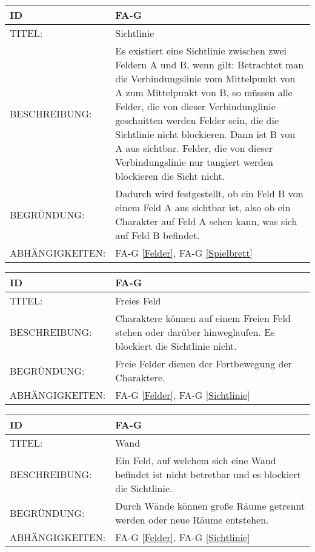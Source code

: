 \begin{tabularx}{16cm}{l|X}
	{table}\label{Sichtlinie}
	\textbf{ID} & \textbf{FA-G \arabic{table}} \\
	\hline
	TITEL: & Sichtlinie \\
	\hline
	BESCHREIBUNG: & Es existiert eine Sichtlinie zwischen zwei Feldern A und B, wenn gilt: Betrachtet man die Verbindungslinie vom Mittelpunkt von A zum Mittelpunkt von B, so müssen alle Felder, die von dieser Verbindunglinie geschnitten werden Felder sein, die die Sichtlinie nicht blockieren. Dann ist B von A aus sichtbar. Felder, die von dieser Verbindungslinie nur tangiert werden blockieren die Sicht nicht. \\
	\hline
	BEGRÜNDUNG: & Dadurch wird festgestellt, ob ein Feld B von einem Feld A aus sichtbar ist, also ob ein Charakter auf Feld A sehen kann, was sich auf Feld B befindet. \\
	\hline
	ABHÄNGIGKEITEN: & FA-G \ref{Felder}, FA-G \ref{Spielbrett} \\
\end{tabularx}

\begin{tabularx}{16cm}{l|X}
	{table}\label{Freies Feld}
	\textbf{ID} & \textbf{FA-G \arabic{table}} \\
	\hline
	TITEL: & Freies Feld \\
	\hline
	BESCHREIBUNG: & Charaktere können auf einem Freien Feld stehen oder darüber hinweglaufen. Es blockiert die Sichtlinie nicht. \\
	\hline
	BEGRÜNDUNG: & Freie Felder dienen der Fortbewegung der Charaktere. \\
	\hline
	ABHÄNGIGKEITEN: & FA-G \ref{Felder}, FA-G \ref{Sichtlinie} \\
\end{tabularx}

\begin{tabularx}{16cm}{l|X}
	{table}\label{Wand}
	\textbf{ID} & \textbf{FA-G \arabic{table}} \\
	\hline
	TITEL: & Wand \\
	\hline
	BESCHREIBUNG: & Ein Feld, auf welchem sich eine Wand befindet ist nicht betretbar und es blockiert die Sichtlinie. \\
	\hline
	BEGRÜNDUNG: & Durch Wände können große Räume getrennt werden oder neue Räume entstehen. \\
	\hline
	ABHÄNGIGKEITEN: & FA-G \ref{Felder}, FA-G \ref{Sichtlinie} \\
\end{tabularx}


